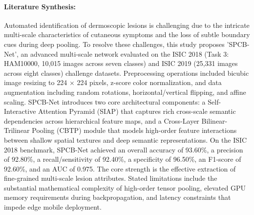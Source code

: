 \paragraph{Literature Synthesis:} Automated identification of dermoscopic lesions is challenging due to the intricate multi-scale characteristics of cutaneous symptoms and the loss of subtle boundary cues during deep pooling. To resolve these challenges, this study proposes 'SPCB-Net', an advanced multi-scale network evaluated on the ISIC 2018 (Task 3: HAM10000, 10,015 images across seven classes) and ISIC 2019 (25,331 images across eight classes) challenge datasets. Preprocessing operations included bicubic image resizing to 224 $\times$ 224 pixels, z-score color normalization, and data augmentation including random rotations, horizontal/vertical flipping, and affine scaling. SPCB-Net introduces two core architectural components: a Self-Interactive Attention Pyramid (SIAP) that captures rich cross-scale semantic dependencies across hierarchical feature maps, and a Cross-Layer Bilinear-Trilinear Pooling (CBTP) module that models high-order feature interactions between shallow spatial textures and deep semantic representations. On the ISIC 2018 benchmark, SPCB-Net achieved an overall accuracy of 93.60\%, a precision of 92.80\%, a recall/sensitivity of 92.40\%, a specificity of 96.50\%, an F1-score of 92.60\%, and an AUC of 0.975. The core strength is the effective extraction of fine-grained multi-scale lesion attributes. Stated limitations include the substantial mathematical complexity of high-order tensor pooling, elevated GPU memory requirements during backpropagation, and latency constraints that impede edge mobile deployment.

